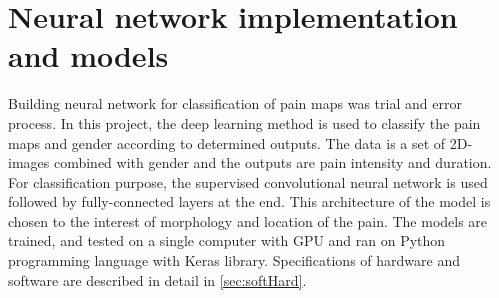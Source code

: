 \newpage
\section{Neural network implementation and models}
Building neural network for classification of pain maps was trial and error process.
In this project, the deep learning method is used to classify the pain maps and gender according to determined outputs. The data is a set of 2D-images combined with gender and the outputs are pain intensity and duration. For classification purpose, the supervised convolutional neural network is used followed by fully-connected layers at the end. This architecture of the model is chosen to the interest of morphology and location of the pain. The models are trained, and tested on a single computer with GPU and ran on Python programming language with Keras library. Specifications of hardware and software are described in detail in \autoref{sec:softHard}.

